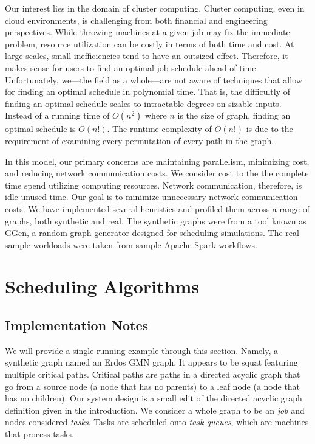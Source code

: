 \documentclass[11pt, oneside]{article}   	%
\begin{document}
Our interest lies in the domain of cluster computing. Cluster computing, even in cloud environments, is challenging from both financial and engineering perspectives. While throwing machines at a given job may fix the immediate problem, resource utilization can be costly in terms of both time and cost. At large scales, small inefficiencies tend to have an outsized effect. Therefore, it makes sense for users to find an optimal job schedule ahead of time. Unfortunately, we---the field as a whole---are not aware of techniques that allow for finding an optimal schedule in polynomial time. That is, the difficultly of finding an optimal schedule scales to intractable degrees on sizable inputs. Instead of a running time of $O(n^2)$ where $n$ is the size of graph, finding an optimal schedule is $O(n!)$. The runtime complexity of $O(n!)$ is due to the requirement of examining every permutation of every path in the graph.

In this model, our primary concerns are maintaining parallelism, minimizing cost, and reducing network communication costs. We consider cost to the the complete time spend utilizing computing resources. Network communication, therefore, is idle unused time. Our goal is to minimize unnecessary network communication costs. We have implemented several heuristics and profiled them across a range of graphs, both synthetic and real. The synthetic graphs were from a tool known as GGen, a random graph generator designed for scheduling simulations. The real sample workloads were taken from sample Apache Spark workflows.

\section{Scheduling Algorithms}

\subsection*{Implementation Notes}

We will provide a single running example through this section. Namely, a synthetic graph named an Erdos GMN graph. It appears to be squat featuring multiple critical paths. Critical paths are paths in a directed acyclic graph that go from a source node (a node that has no parents) to a leaf node (a node that has no children). Our system design is a small edit of the directed acyclic graph definition given in the introduction. We consider a whole graph to be an \emph{job} and nodes considered \emph{tasks}. Tasks are scheduled onto \emph{task queues}, which are machines that process tasks. 
\end{document}
